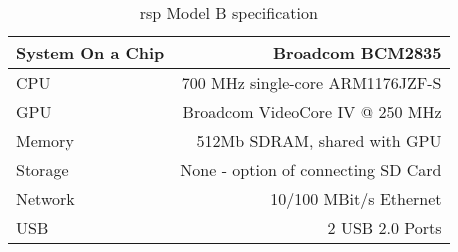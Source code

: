 \begin{table}[ht]
  \centering
  \begin{tabular}{|l|r|}
  \hline
    System On a Chip & Broadcom BCM2835 \\ \hline
    CPU & 700 MHz single-core ARM1176JZF-S \\ \hline
    GPU & Broadcom VideoCore IV @ 250 MHz \\ \hline
    Memory & 512Mb SDRAM, shared with GPU \\ \hline
    Storage & None - option of connecting SD Card \\ \hline
    Network & 10/100 MBit/s Ethernet \\ \hline
    USB & 2 USB 2.0 Ports \\    \hline
  \end{tabular}
  \caption{\gls{rsp} Model B specification\cite{rsp2}}
  \label{tbl:rsp_spec}
\end{table}
